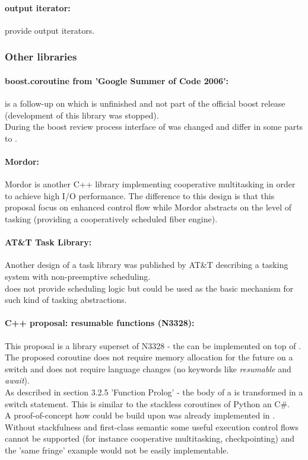 \paragraph*{output iterator:}
 provide output iterators.


\subsubsection*{Other libraries}
\paragraph*{boost.coroutine from 'Google Summer of Code 2006':}
\boostcoroutine is a follow-up on \boostcorosum which is unfinished and
not part of the official boost release (development of this library was
stopped).\\
During the boost review process interface of \boostcoroutine was changed and
differ in some parts to \boostcorosum.

\paragraph*{Mordor:}
Mordor\cite{mordor} is another C++ library implementing cooperative multitasking
in order to achieve high I/O performance. The difference to this design is that
this proposal focus on enhanced control flow while Mordor\cite{mordor} abstracts
on the level of tasking (providing a cooperatively scheduled fiber engine).

\paragraph*{AT\&T Task Library:}
Another design of a task library was published by AT\&T\cite{atnt1989} describing
a tasking system with non-preemptive scheduling.\\
\coro does not provide scheduling logic but could be used as the basic mechanism
for such kind of tasking abstractions.

\paragraph*{C++ proposal: resumable functions (N3328\cite{n3328}):}
This proposal is a library superset of N3328 - the \resumfn can be implemented
on top of \coro. The proposed coroutine does not require memory allocation for
the future on a switch and does not require language changes (no keywords like
\textit{resumable} and \textit{await}).\\
As described in section 3.2.5 'Function Prolog' - the body of a \resumfn is
transformed in a switch statement. This is similar to the stackless coroutines
of Python an C\#.\\
A proof-of-concept how \await could be build upon \boostcoroutine was already
implemented in \awaitemu.\\
\newline
Without stackfulness and first-class semantic some useful execution control
flows cannot be supported (for instance cooperative multitasking,
checkpointing) and the 'same fringe' example would not be easily implementable.
